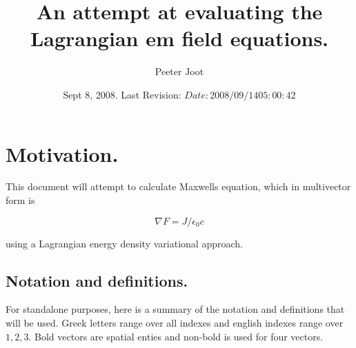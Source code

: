 \documentclass{article}
\title{ An attempt at evaluating the Lagrangian em field equations. }
\author{Peeter Joot}
\date{ Sept 8, 2008.  Last Revision: $Date: 2008/09/14 05:00:42 $ }
\newcommand{\grad}[0]{\nabla}
\begin{document}
\tableofcontents

\maketitle{}

\section{ Motivation. }

This document will attempt to calculate Maxwells equation, which in multivector form is

\begin{equation}\label{eqn:maxwell}
\grad F = J/\epsilon_0 c
\end{equation}

using a Lagrangian energy density variational approach.

\subsection{ Notation and definitions. }

For standalone purposes, here is a summary of the notation and definitions that will be used.  Greek letters range over all indexes and
english indexes range over $1,2,3$.  Bold vectors are spatial enties and non-bold is used for four vectors.
\end{document}
